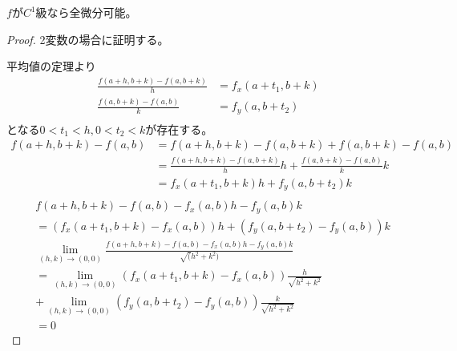 	\begin{prop}
		$f$が$C^1$級なら全微分可能。
	\end{prop}
	\begin{proof}
		2変数の場合に証明する。

		平均値の定理より
		\begin{align*}
			\frac{f(a + h, b + k) - f(a, b + k)}{h} &= f_x(a + t_1, b + k)\\
			\frac{f(a, b + k) - f(a, b)}{k} &= f_y(a, b + t_2)\\
		\end{align*}
		となる$0 < t_1 < h, 0 < t_2 < k$が存在する。
		\begin{align*}
			f(a + h, b + k) - f(a, b)
			&= f(a + h, b + k) - f(a, b + k) + f(a, b + k) - f(a, b)\\
			&= \frac{f(a + h, b + k) - f(a, b + k)}{h}h + \frac{f(a, b + k) - f(a, b)}{k}k\\
			&= f_x(a + t_1, b + k)h + f_y(a, b + t_2)k\\
		\end{align*}
		\begin{align*}
			& f(a + h, b + k) - f(a, b) - f_x(a, b)h - f_y(a, b)k\\
			&= (f_x(a + t_1, b + k) - f_x(a, b))h + (f_y(a, b + t_2) - f_y(a, b))k\\
			& \lim_{(h, k) \to (0, 0)}\frac{f(a + h, b + k) - f(a, b) - f_x(a, b)h - f_y(a, b)k}{\sqrt(h^2 + k^2)}\\
			&= \lim_{(h, k) \to (0, 0)}(f_x(a + t_1, b + k) - f_x(a, b))\frac{h}{\sqrt{h^2 + k^2}}\\
			&+ \lim_{(h, k) \to (0, 0)}(f_y(a, b + t_2) - f_y(a, b))\frac{k}{\sqrt{h^2 + k^2}}\\
			&= 0
		\end{align*}
	\end{proof}

